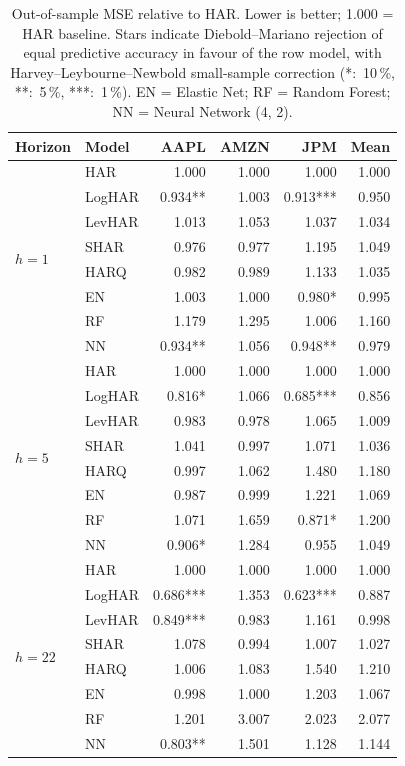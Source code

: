 \documentclass[twocolumn,9pt]{extarticle}
\begin{document}
\begin{table}[H]
\centering\small
\caption{Out-of-sample MSE relative to HAR. Lower is better;
1.000 = HAR baseline. Stars indicate Diebold--Mariano rejection of
equal predictive accuracy in favour of the row model, with
Harvey--Leybourne--Newbold small-sample correction (*:~10\,\%,
**:~5\,\%, ***:~1\,\%). EN = Elastic Net; RF = Random Forest;
NN = Neural Network (4, 2).}
\label{tab:main}
\begin{tabular}{llrrrr}
\toprule
Horizon & Model & AAPL & AMZN & JPM & Mean \\
\midrule
\multirow{8}{*}{$h=1$}
 & HAR     & 1.000      & 1.000  & 1.000      & 1.000 \\
 & LogHAR  & 0.934**    & 1.003  & 0.913***   & 0.950 \\
 & LevHAR  & 1.013      & 1.053  & 1.037      & 1.034 \\
 & SHAR    & 0.976      & 0.977  & 1.195      & 1.049 \\
 & HARQ    & 0.982      & 0.989  & 1.133      & 1.035 \\
 & EN      & 1.003      & 1.000  & 0.980*     & 0.995 \\
 & RF      & 1.179      & 1.295  & 1.006      & 1.160 \\
 & NN      & 0.934**    & 1.056  & 0.948**    & 0.979 \\
\midrule
\multirow{8}{*}{$h=5$}
 & HAR     & 1.000      & 1.000  & 1.000      & 1.000 \\
 & LogHAR  & 0.816*     & 1.066  & 0.685***   & 0.856 \\
 & LevHAR  & 0.983      & 0.978  & 1.065      & 1.009 \\
 & SHAR    & 1.041      & 0.997  & 1.071      & 1.036 \\
 & HARQ    & 0.997      & 1.062  & 1.480      & 1.180 \\
 & EN      & 0.987      & 0.999  & 1.221      & 1.069 \\
 & RF      & 1.071      & 1.659  & 0.871*     & 1.200 \\
 & NN      & 0.906*     & 1.284  & 0.955      & 1.049 \\
\midrule
\multirow{8}{*}{$h=22$}
 & HAR     & 1.000      & 1.000  & 1.000      & 1.000 \\
 & LogHAR  & 0.686***   & 1.353  & 0.623***   & 0.887 \\
 & LevHAR  & 0.849***   & 0.983  & 1.161      & 0.998 \\
 & SHAR    & 1.078      & 0.994  & 1.007      & 1.027 \\
 & HARQ    & 1.006      & 1.083  & 1.540      & 1.210 \\
 & EN      & 0.998      & 1.000  & 1.203      & 1.067 \\
 & RF      & 1.201      & 3.007  & 2.023      & 2.077 \\
 & NN      & 0.803**    & 1.501  & 1.128      & 1.144 \\
\bottomrule
\end{tabular}
\end{table}
\end{document}
